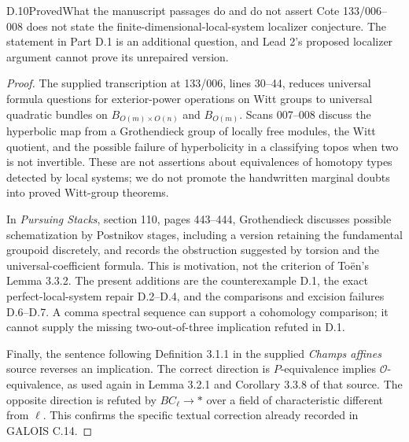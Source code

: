 \begin{claim}{D.10}{Proved}{What the manuscript passages do and do not assert}
\label{D10}
Cote 133/006--008 does not state the finite-dimensional-local-system
localizer conjecture. The statement in Part D.1 is an additional
question, and Lead 2's proposed localizer argument cannot prove its
unrepaired version.
\end{claim}
\begin{proof}
The supplied transcription at 133/006, lines 30--44, reduces
universal formula questions for exterior-power operations on Witt
groups to universal quadratic bundles on
$B_{O(m)\times O(n)}$ and $B_{O(m)}$. Scans 007--008 discuss the
hyperbolic map from a Grothendieck group of locally free modules,
the Witt quotient, and the possible failure of hyperbolicity in a
classifying topos when two is not invertible. These are not
assertions about equivalences of homotopy types detected by local
systems; we do not promote the handwritten marginal doubts into
proved Witt-group theorems.

In \emph{Pursuing Stacks}, section 110, pages 443--444, Grothendieck
discusses possible schematization by Postnikov stages, including a
version retaining the fundamental groupoid discretely, and records
the obstruction suggested by torsion and the universal-coefficient
formula. This is motivation, not the criterion of To\"en's Lemma
3.3.2. The present additions are the counterexample D.1, the exact
perfect-local-system repair D.2--D.4, and the comparisons and
excision failures D.6--D.7. A comma spectral sequence can support
a cohomology comparison; it cannot supply the missing
two-out-of-three implication refuted in D.1.

Finally, the sentence following Definition 3.1.1 in the supplied
\emph{Champs affines} source reverses an implication. The correct
direction is $P$-equivalence implies $\mathcal O$-equivalence,
as used again in Lemma 3.2.1 and Corollary 3.3.8 of that source.
The opposite direction is refuted by $BC_\ell\to *$ over a field
of characteristic different from $\ell$. This confirms the specific
textual correction already recorded in GALOIS C.14.
\end{proof}
